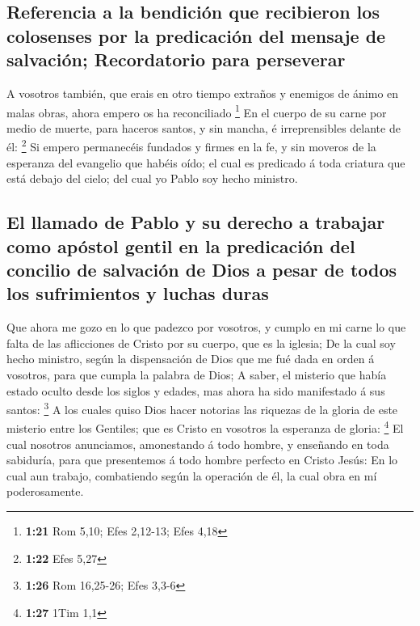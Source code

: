 \hypertarget{referencia-a-la-bendiciuxf3n-que-recibieron-los-colosenses-por-la-predicaciuxf3n-del-mensaje-de-salvaciuxf3n-recordatorio-para-perseverar}{%
\subsection{Referencia a la bendición que recibieron los colosenses por
la predicación del mensaje de salvación; Recordatorio para
perseverar}\label{referencia-a-la-bendiciuxf3n-que-recibieron-los-colosenses-por-la-predicaciuxf3n-del-mensaje-de-salvaciuxf3n-recordatorio-para-perseverar}}

 A vosotros también, que erais en otro tiempo extraños y
enemigos de ánimo en malas obras, ahora empero os ha reconciliado
\footnote{\textbf{1:21} Rom 5,10; Efes 2,12-13; Efes 4,18} 
En el cuerpo de su carne por medio de muerte, para haceros santos, y sin
mancha, é irreprensibles delante de él: \footnote{\textbf{1:22} Efes
  5,27}  Si empero permanecéis fundados y firmes en la fe,
y sin moveros de la esperanza del evangelio que habéis oído; el cual es
predicado á toda criatura que está debajo del cielo; del cual yo Pablo
soy hecho ministro.

\hypertarget{el-llamado-de-pablo-y-su-derecho-a-trabajar-como-apuxf3stol-gentil-en-la-predicaciuxf3n-del-concilio-de-salvaciuxf3n-de-dios-a-pesar-de-todos-los-sufrimientos-y-luchas-duras}{%
\subsection{El llamado de Pablo y su derecho a trabajar como apóstol
gentil en la predicación del concilio de salvación de Dios a pesar de
todos los sufrimientos y luchas
duras}\label{el-llamado-de-pablo-y-su-derecho-a-trabajar-como-apuxf3stol-gentil-en-la-predicaciuxf3n-del-concilio-de-salvaciuxf3n-de-dios-a-pesar-de-todos-los-sufrimientos-y-luchas-duras}}

 Que ahora me gozo en lo que padezco por vosotros, y cumplo
en mi carne lo que falta de las aflicciones de Cristo por su cuerpo, que
es la iglesia;  De la cual soy hecho ministro, según la
dispensación de Dios que me fué dada en orden á vosotros, para que
cumpla la palabra de Dios;  A saber, el misterio que había
estado oculto desde los siglos y edades, mas ahora ha sido manifestado á
sus santos: \footnote{\textbf{1:26} Rom 16,25-26; Efes 3,3-6}
 A los cuales quiso Dios hacer notorias las riquezas de la
gloria de este misterio entre los Gentiles; que es Cristo en vosotros la
esperanza de gloria: \footnote{\textbf{1:27} 1Tim 1,1}  El
cual nosotros anunciamos, amonestando á todo hombre, y enseñando en toda
sabiduría, para que presentemos á todo hombre perfecto en Cristo Jesús:
 En lo cual aun trabajo, combatiendo según la operación de
él, la cual obra en mí poderosamente.

